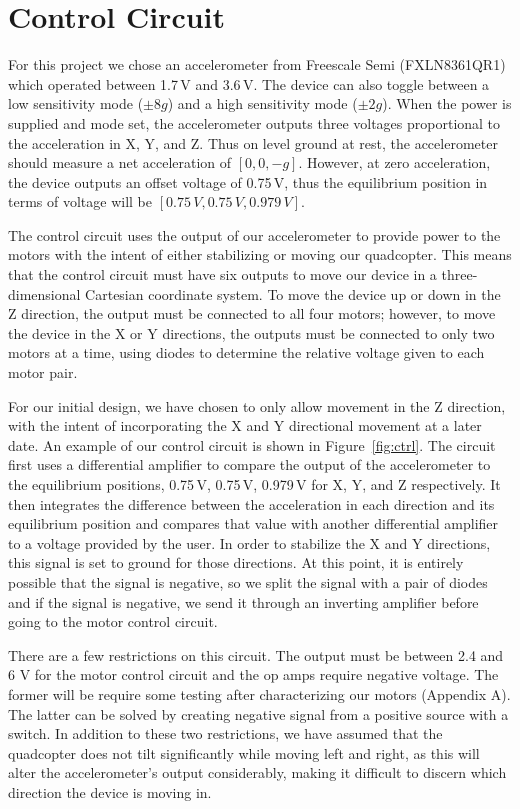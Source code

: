 \section{Control Circuit}

For this project we chose an accelerometer from Freescale Semi (FXLN8361QR1) which operated between 1.7\,V and 3.6\,V. The device can also toggle between a low sensitivity mode ($\pm8g$) and a high sensitivity mode ($\pm2g$). When the power is supplied and mode set, the accelerometer outputs three voltages proportional to the acceleration in X, Y, and Z. Thus on level ground at rest, the accelerometer should measure a net acceleration of $[0,0,-g]$. However, at zero acceleration, the device outputs an offset voltage of 0.75\,V, thus the equilibrium position in terms of voltage will be $[0.75\,V,0.75\,V,0.979\,V]$.

The control circuit uses the output of our accelerometer to provide power to the motors with the intent of either stabilizing or moving our quadcopter. This means that the control circuit must have six outputs to move our device in a three-dimensional Cartesian coordinate system. To move the device up or down in the Z direction, the output must be connected to all four motors; however, to move the device in the X or Y directions, the outputs must be connected to only two motors at a time, using diodes to determine the relative voltage given to each motor pair. 

For our initial design, we have chosen to only allow movement in the Z direction, with the intent of incorporating the X and Y directional movement at a later date. An example of our control circuit is shown in Figure~\ref{fig:ctrl}. The circuit first uses a differential amplifier to compare the output of the accelerometer to the equilibrium positions, 0.75\,V, 0.75\,V, 0.979\,V for X, Y, and Z respectively. It then integrates the difference between the acceleration in each direction and its equilibrium position and compares that value with another differential amplifier to a voltage provided by the user. In order to stabilize the X and Y directions, this signal is set to ground for those directions. At this point, it is entirely possible that the signal is negative, so we split the signal with a pair of diodes and if the signal is negative, we send it through an inverting amplifier before going to the motor control circuit.

There are a few restrictions on this circuit. The output must be between 2.4 and 6 V for the motor control circuit and the op amps require negative voltage. The former will be require some testing after characterizing our motors (Appendix A). The latter can be solved by creating negative signal from a positive source with a switch. In addition to these two restrictions, we have assumed that the quadcopter does not tilt significantly while moving left and right, as this will alter the accelerometer's output considerably, making it difficult to discern which direction the device is moving in.

